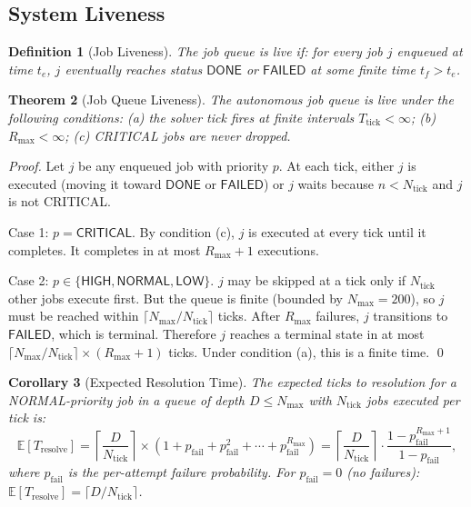 \documentclass[12pt]{article}
\newtheorem{theorem}{Theorem}
\newtheorem{corollary}[theorem]{Corollary}
\newtheorem{definition}[theorem]{Definition}
\begin{document}
\subsection{System Liveness}

\begin{definition}[Job Liveness]
  The job queue is \emph{live} if: for every job $j$ enqueued at time $t_e$,
  $j$ eventually reaches status $\mathsf{DONE}$ or $\mathsf{FAILED}$ at some
  finite time $t_f > t_e$.
\end{definition}

\begin{theorem}[Job Queue Liveness]
  \label{thm:liveness}
  The autonomous job queue is live under the following conditions:
  (a) the solver tick fires at finite intervals $T_\text{tick} < \infty$;
  (b) $R_\text{max} < \infty$;
  (c) CRITICAL jobs are never dropped.
\end{theorem}

\begin{proof}
  Let $j$ be any enqueued job with priority $p$.  At each tick, either $j$
  is executed (moving it toward $\mathsf{DONE}$ or $\mathsf{FAILED}$) or $j$
  waits because $n < N_\text{tick}$ and $j$ is not CRITICAL.

  Case 1: $p = \mathsf{CRITICAL}$.  By condition (c), $j$ is executed at every
  tick until it completes.  It completes in at most
  $R_\text{max} + 1$ executions.

  Case 2: $p \in \{\mathsf{HIGH}, \mathsf{NORMAL}, \mathsf{LOW}\}$.
  $j$ may be skipped at a tick only if $N_\text{tick}$ other jobs execute first.
  But the queue is finite (bounded by $N_\text{max} = 200$), so $j$ must be
  reached within $\lceil N_\text{max} / N_\text{tick} \rceil$ ticks.  After
  $R_\text{max}$ failures, $j$ transitions to $\mathsf{FAILED}$, which is
  terminal.  Therefore $j$ reaches a terminal state in at most
  $\lceil N_\text{max} / N_\text{tick} \rceil \times (R_\text{max} + 1)$ ticks.
  Under condition (a), this is a finite time. \qed
\end{proof}

\begin{corollary}[Expected Resolution Time]
  The expected ticks to resolution for a NORMAL-priority job in a queue of
  depth $D \le N_\text{max}$ with $N_\text{tick}$ jobs executed per tick is:
  \[
    \mathbb{E}[T_\text{resolve}] = \left\lceil \frac{D}{N_\text{tick}} \right\rceil
    \times (1 + p_\text{fail} + p_\text{fail}^2 + \cdots + p_\text{fail}^{R_\text{max}})
    = \left\lceil \frac{D}{N_\text{tick}} \right\rceil \cdot
    \frac{1 - p_\text{fail}^{R_\text{max}+1}}{1 - p_\text{fail}},
  \]
  where $p_\text{fail}$ is the per-attempt failure probability.
  For $p_\text{fail} = 0$ (no failures): $\mathbb{E}[T_\text{resolve}]
  = \lceil D / N_\text{tick} \rceil$.
\end{corollary}
\end{document}
